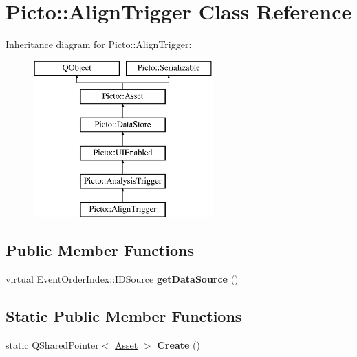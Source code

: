 \hypertarget{class_picto_1_1_align_trigger}{\section{Picto\-:\-:Align\-Trigger Class Reference}
\label{class_picto_1_1_align_trigger}
}
Inheritance diagram for Picto\-:\-:Align\-Trigger\-:\begin{figure}[H]
\begin{center}
\leavevmode
\includegraphics[height=6.000000cm]{class_picto_1_1_align_trigger}
\end{center}
\end{figure}
\subsection*{Public Member Functions}
\begin{DoxyCompactItemize}
\item 
\hypertarget{class_picto_1_1_align_trigger_ac2cbb2b7fa00d0b2fac192541b55df9f}{virtual Event\-Order\-Index\-::\-I\-D\-Source {\bfseries get\-Data\-Source} ()}\label{class_picto_1_1_align_trigger_ac2cbb2b7fa00d0b2fac192541b55df9f}

\end{DoxyCompactItemize}
\subsection*{Static Public Member Functions}
\begin{DoxyCompactItemize}
\item 
\hypertarget{class_picto_1_1_align_trigger_a08ef0ec1733e0370af9f7eddbf6938b8}{static Q\-Shared\-Pointer$<$ \hyperlink{class_picto_1_1_asset}{Asset} $>$ {\bfseries Create} ()}\label{class_picto_1_1_align_trigger_a08ef0ec1733e0370af9f7eddbf6938b8}

\end{DoxyCompactItemize}
